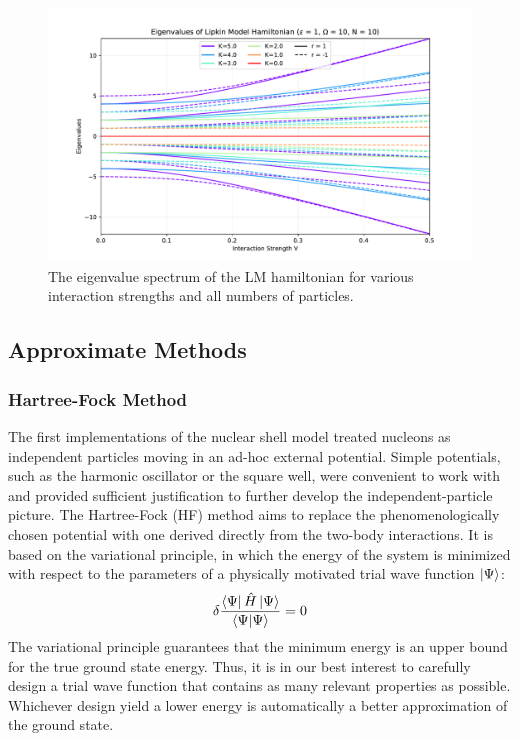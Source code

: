 \documentclass[prb,aps,twocolumn,showpacs,10pt]{revtex4-2}
\begin{document}
\begin{figure}
  \includegraphics[width=\textwidth]{../figures/plot_lipkin_all_energies.pdf}
  \caption{The eigenvalue spectrum of the LM hamiltonian for various interaction strengths and all numbers of particles.}
\end{figure}


\subsection{Approximate Methods}

\subsubsection{Hartree-Fock Method}

The first implementations of the nuclear shell model treated nucleons as independent particles moving in an ad-hoc external potential. Simple potentials, such as the harmonic oscillator or the square well, were convenient to work with and provided sufficient justification to further develop the independent-particle picture. The Hartree-Fock (HF) method aims to replace the phenomenologically chosen potential with one derived directly from the two-body interactions. It is based on the variational principle, in which the energy of the system is minimized with respect to the parameters of a physically motivated trial wave function $\ket{\Psi}$:
\begin{equation}
\delta \frac{\bra{\Psi} \hat{H} \ket{\Psi}}{\bra{\Psi}\ket{\Psi}} = 0
\end{equation}
The variational principle guarantees that the minimum energy is an upper bound for the true ground state energy. Thus, it is in our best interest to carefully design a trial wave function that contains as many relevant properties as possible. Whichever design yield a lower energy is automatically a better approximation of the ground state. 
\end{document}
